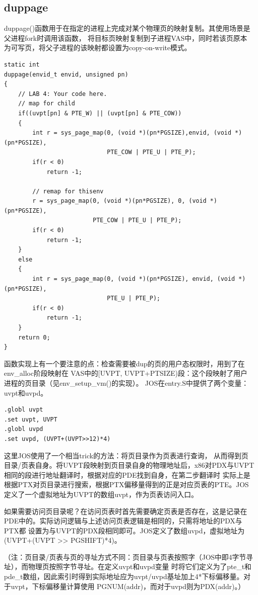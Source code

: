 \documentclass[12pt, letterpaper]{report}
\begin{document}
\subsection{duppage}
duppage()函数用于在指定的进程上完成对某个物理页的映射复制。其使用场景是父进程fork时调用该函数，
将目标页映射复制到子进程VAS中，同时若该页原本为可写页，将父子进程的该映射都设置为copy-on-write模式。

\lstset{style=CStyle}
\setmainfont{Consolas}
\begin{lstlisting}
static int
duppage(envid_t envid, unsigned pn)
{
    // LAB 4: Your code here.
    // map for child
    if((uvpt[pn] & PTE_W) || (uvpt[pn] & PTE_COW))
    {
        int r = sys_page_map(0, (void *)(pn*PGSIZE),envid, (void *)(pn*PGSIZE), 
                             PTE_COW | PTE_U | PTE_P);
        if(r < 0)
            return -1;
        
        // remap for thisenv
        r = sys_page_map(0, (void *)(pn*PGSIZE), 0, (void *)(pn*PGSIZE),
                         PTE_COW | PTE_U | PTE_P);
        if(r < 0)
            return -1;
    }
    else
    {
        int r = sys_page_map(0, (void *)(pn*PGSIZE), envid, (void *)(pn*PGSIZE),
                             PTE_U | PTE_P);
        if(r < 0)
            return -1;
    }
    return 0;
}
\end{lstlisting}
\setmainfont{Times New Roman}

\newpage
函数实现上有一个要注意的点：检查需要被dup的页的用户态权限时，用到了在env\_alloc阶段映射在
VAS中的[UVPT, UVPT+PTSIZE)段：这个段映射了用户进程的页目录（见env\_setup\_vm()的实现）。
JOS在entry.S中提供了两个变量：uvpt和uvpd。\par 

\lstset{style=AssemblyStyle}
\setmainfont{Consolas}
\begin{lstlisting}
.globl uvpt
.set uvpt, UVPT
.globl uvpd
.set uvpd, (UVPT+(UVPT>>12)*4)
\end{lstlisting}
\setmainfont{Times New Roman}
\par 这里JOS使用了一个相当trick的方法：将页目录作为页表进行查询，
从而得到页目录/页表自身。将UVPT段映射到页目录自身的物理地址后，x86对PDX与UVPT相同的段进行地址翻译时，根据对应的PDE找到自身，在第二步翻译时
实际上是根据PTX对页目录进行搜索，根据PTX偏移量得到的正是对应页表的PTE。JOS定义了一个虚拟地址为UVPT的数组uvpt，作为页表访问入口。\par 
如果需要访问页目录呢？在访问页表时首先需要确定页表是否存在，这是记录在PDE中的。实际访问逻辑与上述访问页表逻辑是相同的，只需将地址的PDX与PTX都
设置为与UVPT的PDX段相同即可。JOS定义了数组uvpd，虚拟地址为(UVPT+(UVPT >> PGSHIFT)*4)。\par
（注：页目录/页表与页的寻址方式不同：页目录与页表按照字（JOS中即4字节寻址），而物理页按照字节寻址。在定义uvpt和uvpd变量
时将它们定义为了pte\_t和pde\_t数组，因此索引时得到实际地址应为uvpt/uvpd基址加上4*下标偏移量。对于uvpt，下标偏移量计算使用
PGNUM(addr)，而对于uvpd则为PDX(addr)。）\par 
\end{document}
